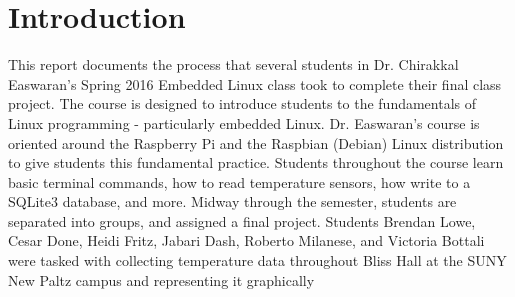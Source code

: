\documentclass{article}
\begin{document}
	\section{Introduction}\label{sec:intro}
		This report documents the process that several students in Dr. Chirakkal Easwaran's Spring 2016
		Embedded Linux class took to complete their final class project. The course is designed to introduce students to 
		the fundamentals of Linux programming - particularly embedded Linux. Dr. Easwaran's course is oriented around the Raspberry Pi
		and the Raspbian (Debian) Linux distribution to give students this fundamental practice. Students throughout the 	
		course learn basic terminal commands, how to read temperature sensors, how write to a SQLite3 database, and more. Midway 
		through the semester, students are separated into groups, and assigned a final project. Students Brendan Lowe, Cesar 
		Done, Heidi Fritz, Jabari Dash, Roberto Milanese, and Victoria Bottali were tasked with collecting 
		temperature data throughout Bliss Hall at the SUNY New Paltz campus and representing it graphically
\end{document}
